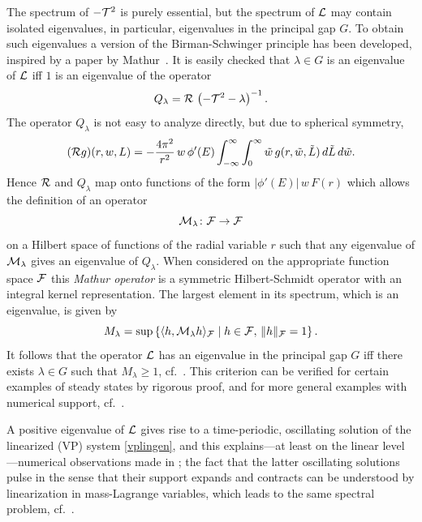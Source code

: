 \documentclass[11pt]{article}
\begin{document}
The spectrum of $-{\cal T}^2$ is purely essential, but the spectrum of ${\cal L}$
may contain isolated eigenvalues, in particular, eigenvalues in
the principal gap $G$. To obtain such eigenvalues a version
of the  Birman-Schwinger principle has been developed, inspired
by a paper by {\sc Mathur}~\cite{Ma}.
It is easily checked that $\lambda\in G$
is an eigenvalue of ${\cal L}$ iff $1$ is an eigenvalue of the operator 
\[
Q_\lambda = {{\cal R}}\, \left(-{\cal T}^2 - \lambda \right)^{-1}.
\]
The operator $Q_\lambda$ is not easy to analyze directly,
but due to spherical symmetry,
\[ 
({{\cal R}} g)(r,w,L) = -\frac{4\pi^2}{r^2}\,w\,\phi'(E)
\int_{-\infty}^\infty \int_0^\infty \tilde w\, g(r,\tilde w,\tilde L)
\,d\tilde L\, d\tilde w.
\]
Hence ${{\cal R}}$ and $Q_\lambda$ map onto
functions of the form $\vert\phi'(E)\vert\,w\,F(r)$ which
allows the definition of an operator
\[
{\cal M}_\lambda \colon {\cal F} \to {\cal F} 
\]
on a Hilbert space of functions of the radial variable $r$ such that
any eigenvalue of ${\cal M}_\lambda$ gives an eigenvalue of $Q_\lambda$.
When considered on the appropriate function space ${\cal F}$ this
{\em Mathur operator} is a symmetric Hilbert-Schmidt operator with
an integral kernel representation. The largest element in its spectrum,
which is an eigenvalue,
is given by
\[
M_\lambda = 
\sup\left\{ \langle h,{\cal M}_\lambda h\rangle_{{\cal F}} \mid
h\in{\cal F},\,\|h\|_{{\cal F}}=1\right\}.
\]
It follows that the operator ${\cal L}$ has an eigenvalue
in the principal gap $G$ iff there exists $\lambda\in G$
such that $M_\lambda\geq 1$, cf.~\cite[Theorem~8.11]{HaStrRe2022}.
This criterion can be verified for certain examples of steady states
by rigorous proof, and for more general examples with numerical support,
cf.~\cite[Section~8.2]{HaStrRe2022}.

A positive eigenvalue of ${\cal L}$ gives rise to a time-periodic, oscillating
solution of the linearized (VP) system \eqref{vplingen}, and this
explains---at least on the linear level---numerical observations made
in \cite{RaRe2018}; the fact that the latter
oscillating solutions pulse in the sense that their support expands
and contracts can be understood by linearization in mass-Lagrange variables,
which leads to the same spectral problem,
cf.~\cite[Section~3.2]{HaStrRe2022}.
\end{document}
